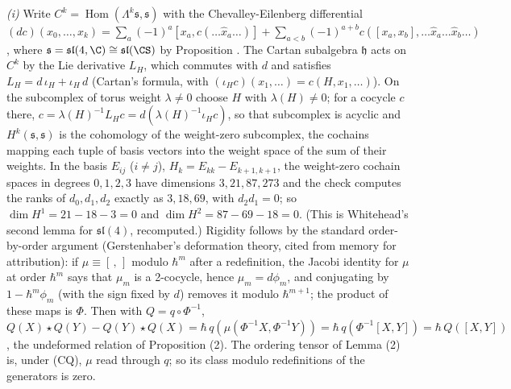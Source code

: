 \emph{(i)} Write $C^{k} = \operatorname{Hom}(\Lambda^{k}\mathfrak{s}, \mathfrak{s})$ with the Chevalley-Eilenberg differential $(dc)(x_{0}, \dots, x_{k}) = \sum_{a}(-1)^{a}[x_{a}, c(\dots\hat{x}_{a}\dots)] + \sum_{a<b}(-1)^{a+b}c([x_{a}, x_{b}], \dots\hat{x}_{a}\dots\hat{x}_{b}\dots)$, where $\mathfrak{s} = \mathfrak{sl}(4,\C) \cong \mathfrak{sl}(\CS)$ by Proposition . The Cartan subalgebra $\mathfrak{h}$ acts on $C^{k}$ by the Lie derivative $L_{H}$, which commutes with $d$ and satisfies $L_{H} = d\,\iota_{H} + \iota_{H}\,d$ (Cartan's formula, with $(\iota_{H}c)(x_{1}, \dots) = c(H, x_{1}, \dots)$). On the subcomplex of torus weight $\lambda \neq 0$ choose $H$ with $\lambda(H) \neq 0$; for a cocycle $c$ there, $c = \lambda(H)^{-1}L_{H}c = d(\lambda(H)^{-1}\iota_{H}c)$, so that subcomplex is acyclic and $H^{k}(\mathfrak{s}, \mathfrak{s})$ is the cohomology of the weight-zero subcomplex, the cochains mapping each tuple of basis vectors into the weight space of the sum of their weights. In the basis $E_{ij}$ ($i \neq j$), $H_{k} = E_{kk} - E_{k+1,k+1}$, the weight-zero cochain spaces in degrees $0, 1, 2, 3$ have dimensions $3, 21, 87, 273$ and the check computes the ranks of $d_{0}, d_{1}, d_{2}$ exactly as $3, 18, 69$, with $d_{2}d_{1} = 0$; so $\dim H^{1} = 21 - 18 - 3 = 0$ and $\dim H^{2} = 87 - 69 - 18 = 0$. (This is Whitehead's second lemma for $\mathfrak{sl}(4)$, recomputed.) Rigidity follows by the standard order-by-order argument (Gerstenhaber's deformation theory, cited from memory for attribution): if $\mu \equiv [\,,\,]$ modulo $\hbar^{m}$ after a redefinition, the Jacobi identity for $\mu$ at order $\hbar^{m}$ says that $\mu_{m}$ is a 2-cocycle, hence $\mu_{m} = d\phi_{m}$, and conjugating by $1 - \hbar^{m}\phi_{m}$ (with the sign fixed by $d$) removes it modulo $\hbar^{m+1}$; the product of these maps is $\Phi$. Then with $Q = q\circ\Phi^{-1}$, $Q(X)\star Q(Y) - Q(Y)\star Q(X) = \hbar\,q(\mu(\Phi^{-1}X, \Phi^{-1}Y)) = \hbar\,q(\Phi^{-1}[X, Y]) = \hbar\,Q([X,Y])$, the undeformed relation of Proposition (2). The ordering tensor of Lemma (2) is, under (CQ), $\mu$ read through $q$; so its class modulo redefinitions of the generators is zero.


